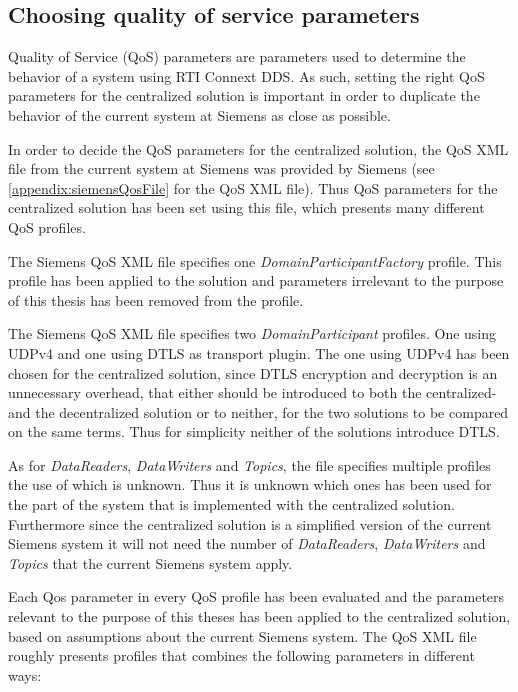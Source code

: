 \subsection{Choosing quality of service parameters}\label{sec:choosingQosParams}

Quality of Service (QoS) parameters are parameters used to determine the behavior of a system using RTI Connext DDS. As such, setting the right QoS parameters for the centralized solution is important in order to duplicate the behavior of the current system at Siemens as close as possible. 

In order to decide the QoS parameters for the centralized solution, the QoS XML file from the current system at Siemens was provided by Siemens (see \cref{appendix:siemensQosFile} for the QoS XML file). Thus QoS parameters for the centralized solution has been set using this file, which presents many different QoS profiles.

The Siemens QoS XML file specifies one \textit{DomainParticipantFactory} profile. This profile has been applied to the solution and parameters irrelevant to the purpose of this thesis has been removed from the profile. 

The Siemens QoS XML file specifies two \textit{DomainParticipant} profiles. One using UDPv4 and one using DTLS as transport plugin. The one using UDPv4 has been chosen for the centralized solution, since DTLS encryption and decryption is an unnecessary overhead, that either should be introduced to both the centralized- and the decentralized solution or to neither, for the two solutions to be compared on the same terms. Thus for simplicity neither of the solutions introduce DTLS.

As for \textit{DataReaders}, \textit{DataWriters} and \textit{Topics}, the file specifies multiple profiles the use of which is unknown. Thus it is unknown which ones has been used for the part of the system that is implemented with the centralized solution. Furthermore since the centralized solution is a simplified version of the current Siemens system it will not need the number of \textit{DataReaders}, \textit{DataWriters} and \textit{Topics} that the current Siemens system apply.

Each Qos parameter in every QoS profile has been evaluated and the parameters relevant to the purpose of this theses has been applied to the centralized solution, based on assumptions about the current Siemens system. The QoS XML file roughly presents profiles that combines the following parameters in different ways:

